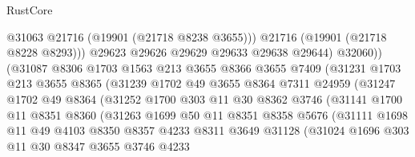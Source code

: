 \begin{lexlean}{RustCore}
\begin{coremodule}
                            @31063
                            @21716
                            (@19901 (@21718 @8238 @3655)))
                          @21716
                          (@19901 (@21718 @8228 @8293)))
                        @29623
                        @29626
                        @29629
                        @29633
                        @29638
                        @29644)
                      @32060))
                  (@31087
                    @8306
                    @1703
                    @1563
                    @213
                    @3655
                    @8366
                    @3655
                    @7409
                    (@31231
                      @1703
                      @213
                      @3655
                      @8365
                      (@31239
                        @1702
                        @49
                        @3655
                        @8364
                        @7311
                        @24959
                        (@31247
                          @1702
                          @49
                          @8364
                          (@31252
                            @1700
                            @303
                            @11
                            @30
                            @8362
                            @3746
                            (@31141
                              @1700
                              @11
                              @8351
                              @8360
                              (@31263
                                @1699
                                @50
                                @11
                                @8351
                                @8358
                                @5676
                                (@31111
                                  @1698
                                  @11
                                  @49
                                  @4103
                                  @8350
                                  @8357
                                  @4233
                                  @8311
                                  @3649
                                  @31128
                                  (@31024
                                    @1696
                                    @303
                                    @11
                                    @30
                                    @8347
                                    @3655
                                    @3746
                                    @4233

\end{coremodule}
\end{lexlean}
